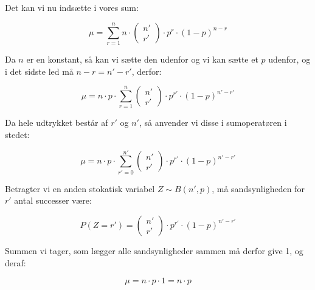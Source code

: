 \documentclass{article}
\makeatletter
\newenvironment{proofw}{\par
  \pushQED{\qed}%
  \normalfont \topsep6\p@\@plus6\p@\relax
  \trivlist
  \item[]\ignorespaces
}{%
  \popQED\endtrivlist\@endpefalse
}
\makeatother
\begin{document}
\begin{proofw}
Det kan vi nu indsætte i vores sum:

$$
\mu =
\sum_{r=1}^{n}  n \cdot \begin{pmatrix}
        n' \\ r'
    \end{pmatrix}
    \cdot p^r \cdot (1-p)^{n-r}
$$

Da $n$ er en konstant, så kan vi sætte den udenfor og vi kan sætte et $p$ udenfor,
og i det sidste led må $n-r=n'-r'$, derfor:

$$
\mu =
n \cdot p \cdot \sum_{r=1}^{n}  \begin{pmatrix}
        n' \\ r'
    \end{pmatrix}
    \cdot p^{r'} \cdot (1-p)^{n'-r'}
$$

Da hele udtrykket består af $r'$ og $n'$, så anvender vi disse i sumoperatøren i stedet:

$$
\mu =
n \cdot p \cdot \sum_{r'=0}^{n'}  \begin{pmatrix}
        n' \\ r'
    \end{pmatrix}
    \cdot p^{r'} \cdot (1-p)^{n'-r'}
$$

Betragter vi en anden stokatisk variabel $Z \sim B(n', p)$,
må sandsynligheden for $r'$ antal successer være:

$$
    P(Z=r')=\begin{pmatrix}
        n' \\ r'
    \end{pmatrix}
    \cdot p^{r'}
    \cdot (1-p)^{n'-r'}
$$

Summen vi tager, som lægger alle sandsynligheder sammen
må derfor give 1, og deraf:

$$
\mu =
n \cdot p \cdot 1=n\cdot p
$$

\end{proofw}
\end{document}
